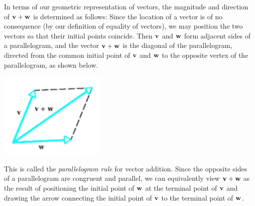 \documentclass[12pt,letterpaper,reqno]{article}
\numberwithin{equation}{section}
\newcommand{\ti}[1]{\textit{#1}}
\begin{document}
In terms of our geometric representation of vectors, the magnitude and direction of ${\bf v}+{\bf w}$ is determined as follows: Since the location of a vector is of no consequence (by our definition of equality of vectors), we may position the two vectors so that their initial points coincide. Then ${\bf v}$ and ${\bf w}$ form adjacent sides of a parallelogram, and the vector ${\bf v}+{\bf w}$ is the diagonal of the parallelogram, directed from the common initial point of ${\bf v}$ and ${\bf w}$ to the opposite vertex of the parallelogram, as shown below.	
\begin{center}
	\includegraphics[scale=0.5]{figures_mvc/parallelogram_rule}
\end{center}
This is called the \ti{parallelogram rule} for vector addition. Since the opposite sides of a parallelogram are congruent and parallel, we can equivalently view ${\bf v}+{\bf w}$ as the result of positioning the initial point of ${\bf w}$ at the terminal point of ${\bf v}$ and drawing the arrow connecting the initial point of ${\bf v}$ to the terminal point of ${\bf w}$.
\end{document}
